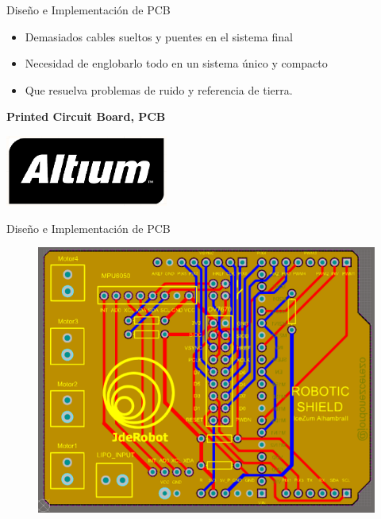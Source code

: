 \documentclass{beamer}
\begin{document}
\begin{frame}{Diseño e Implementación de PCB}
\begin{block}{}
	\begin{itemize}
		\item Demasiados cables sueltos y puentes en el sistema final \pause
		\item Necesidad de englobarlo todo en un sistema único y compacto \pause
		\item Que resuelva problemas de ruido y referencia de tierra. \pause
	\end{itemize}
\end{block}
\begin{alertblock}{}
	\centering \textbf{Printed Circuit Board, PCB} 
	\begin{center}
		\includegraphics [width =0.4\textwidth ]{imagenes/altium}
	\end{center}
\end{alertblock}
\end{frame}

\begin{frame}{Diseño e Implementación de PCB}
\begin{figure}[H]
	\center
	\includegraphics[scale=0.35, angle=0]{imagenes/Balancing_Robot/layers_altium.PNG}
\end{figure}
\end{frame}
\end{document}
